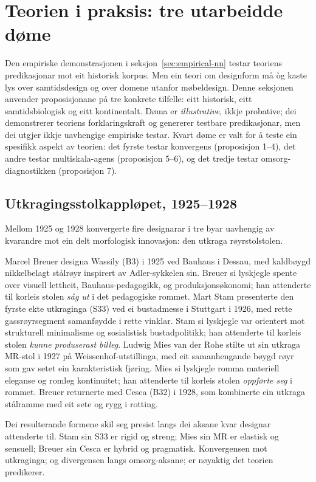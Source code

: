 \section{Teorien i praksis: tre utarbeidde døme}
\label{sec:examples-nn}

Den empiriske demonstrasjonen i seksjon~\ref{sec:empirical-nn} testar teoriens predikasjonar mot eit historisk korpus. Men ein teori om designform må òg kaste lys over samtidsdesign og over domene utanfor møbeldesign. Denne seksjonen anvender proposisjonane på tre konkrete tilfelle: eitt historisk, eitt samtidsbiologisk og eitt kontinentalt. Døma er \textit{illustrative}, ikkje probative; dei demonstrerer teoriens forklaringskraft og genererer testbare predikasjonar, men dei utgjer ikkje uavhengige empiriske testar. Kvart døme er valt for å teste ein spesifikk aspekt av teorien: det fyrste testar konvergens (proposisjon 1--4), det andre testar multiskala-agens (proposisjon 5--6), og det tredje testar omsorg-diagnostikken (proposisjon 7).

\subsection{Utkragingsstolkappløpet, 1925--1928}

Mellom 1925 og 1928 konvergerte fire designarar i tre byar uavhengig av kvarandre mot ein delt morfologisk innovasjon: den utkraga røyrstolstolen.

Marcel Breuer designa Wassily (B3) i 1925 ved Bauhaus i Dessau, med kaldbøygd nikkelbelagt stålrøyr inspirert av Adler-sykkelen sin. Breuer si lyskjegle spente over visuell lettheit, Bauhaus-pedagogikk, og produksjonsøkonomi; han attenderte til korleis stolen \textit{såg ut} i det pedagogiske rommet. Mart Stam presenterte den fyrste ekte utkraginga (S33) ved ei bustadmesse i Stuttgart i 1926, med rette gassrøyrsegment samanføydde i rette vinklar. Stam si lyskjegle var orientert mot strukturell minimalisme og sosialistisk bustadpolitikk; han attenderte til korleis stolen \textit{kunne produserast billeg}. Ludwig Mies van der Rohe stilte ut sin utkraga MR-stol i 1927 på Weissenhof-utstillinga, med eit samanhengande bøygd røyr som gav setet ein karakteristisk fjøring. Mies si lyskjegle romma materiell eleganse og romleg kontinuitet; han attenderte til korleis stolen \textit{oppførte seg} i rommet. Breuer returnerte med Cesca (B32) i 1928, som kombinerte ein utkraga stålramme med eit sete og rygg i rotting.

Dei resulterande formene skil seg presist langs dei aksane kvar designar attenderte til. Stam sin S33 er rigid og streng; Mies sin MR er elastisk og sensuell; Breuer sin Cesca er hybrid og pragmatisk. Konvergensen mot utkraginga; og divergensen langs omsorg-aksane; er nøyaktig det teorien predikerer.

